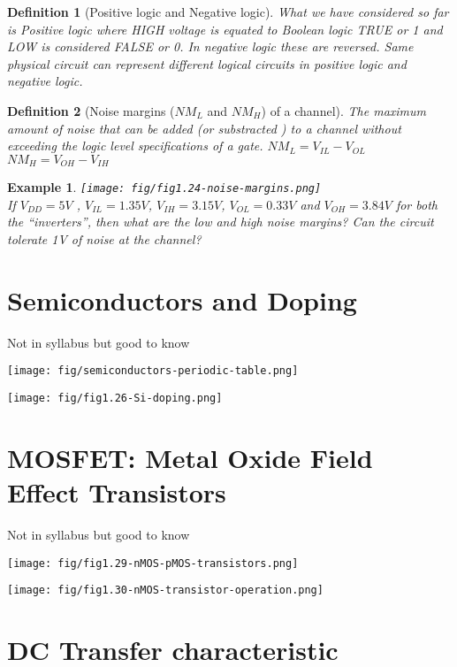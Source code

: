 \documentclass{article}
\newtheorem{example}{Example}
\newtheorem{definition}{Definition}
\newcommand{\notescol}{white}
\begin{document}
\begin{definition}[Positive logic and Negative logic]
  \color{\notescol}
  What we have considered so far is Positive logic where \emph{HIGH} voltage is
  equated to Boolean logic \emph{TRUE} or \emph{1} and \emph{LOW} is considered
  \emph{FALSE} or \emph{0}. In negative logic these are reversed. Same physical
  circuit can represent different logical circuits in positive logic and
  negative logic.
\end{definition}

\begin{definition}[Noise margins ($NM_L$ and $NM_H$) of a channel]
  \color{\notescol}
  The maximum amount of noise that can be added (or substracted ) to a channel
  without exceeding the logic level specifications of a gate.  
  $NM_L  = V_{IL} - V_{OL}$ \\
  $NM_H  = V_{OH} - V_{IH}$
\end{definition}

\begin{example}
  \texttt{[image: fig/fig1.24-noise-margins.png]}\\
  If $V_{DD} = 5V$ , $V_{IL} = 1.35V$, $V_{IH} = 3.15V$, $V_{OL} = 0.33V$ and
  $V_{OH} = 3.84V$ for both the ``inverters'', then what are the low and high
  noise margins? Can the circuit tolerate 1V of noise at the channel?
\end{example}
\vspace{10em}

\section{Semiconductors and Doping}
{\tiny{Not in syllabus but good to know}}

\texttt{[image: fig/semiconductors-periodic-table.png]}


\texttt{[image: fig/fig1.26-Si-doping.png]}

\section{MOSFET: Metal Oxide Field Effect Transistors }
{\tiny{Not in syllabus but good to know}}

\texttt{[image: fig/fig1.29-nMOS-pMOS-transistors.png]}

\texttt{[image: fig/fig1.30-nMOS-transistor-operation.png]}

\section{DC Transfer characteristic}
\end{document}
